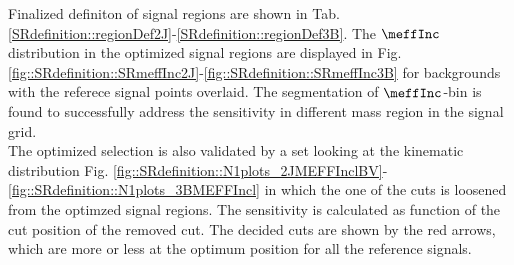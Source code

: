 Finalized definiton of signal regions are shown in Tab. \ref{SRdefinition::regionDef2J}-\ref{SRdefinition::regionDef3B}. The $\meffInc$ distribution in the optimized signal regions are displayed in Fig. \ref{fig::SRdefinition::SRmeffInc2J}-\ref{fig::SRdefinition::SRmeffInc3B} for backgrounds with the referece signal points overlaid. The segmentation of $\meffInc$-bin is found to successfully address the sensitivity in different mass region in the signal grid. \\

The optimized selection is also validated by a set looking at the kinematic distribution Fig. \ref{fig::SRdefinition::N1plots_2JMEFFInclBV}-\ref{fig::SRdefinition::N1plots_3BMEFFIncl} in which the one of the cuts is loosened from the optimzed signal regions. The sensitivity is calculated as function of the cut position of the removed cut. The decided cuts are shown by the red arrows, which are more or less at the optimum position for all the reference signals.





\clearpage				
